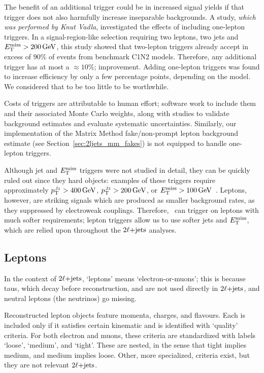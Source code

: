 The benefit of an additional trigger could be in increased signal yields if
that trigger does not also harmfully increase inseparable backgrounds.
A study, \emph{which was performed by Knut Vadla}, investigated the effects
of including one-lepton triggers.
In a signal-region-like selection requiring two leptons, two jets and
$\met > 200\,\eV[G]$, this study showed that two-lepton triggers already accept
in excess of $90\%$ of events from benchmark C1N2 models.
Therefore, any additional trigger has at most a $\approx10\%$;
improvement. Adding one-lepton triggers was found to increase efficiency by
only a few percentage points, depending on the model.
We considered that to be too little to be worthwhile.

Costs of triggers are attributable to human effort;
software work to include them and their associated Monte Carlo weights, along
with studies to validate background estimates and evaluate systematic
uncertainties.
Similarly, our implementation of the Matrix Method fake/non-prompt lepton
background estimate (see Section~\ref{sec:2ljets_mm_fakes}) is not equipped to
handle one-lepton triggers.

Although jet and $\met$ triggers were not studied in detail, they can be
quickly ruled out since they hard objects: examples of these triggers require
approximately $\ptjone > 400\,\eV[G]$, $p_\mathrm{T}^{\,j_3} > 200\,\eV[G]$, or
$\met > 100\,\eV[G]$~\cite{atlas_twiki_lowest_unprescaled}.
Leptons, however, are striking signals which are produced as smaller background
rates, as they suppressed by electroweak couplings.
Therefore, \atlas\ can trigger on leptons with much softer requirements;
lepton triggers allow us to use softer jets and $\met$, which are relied upon
throughout the $\twoljets$ analyses.


\subsection{Leptons}
In the context of $\twoljets$, `leptons' means `electron-or-muons';
this is because taus, which decay before reconstruction, and are not used
directly in $\twoljets$, and neutral leptons (the neutrinos) go missing.

Reconstructed lepton objects feature momenta, charges, and flavours.
Each is included only if it satisfies certain kinematic and
is identified with `quality' criteria.
For both electron and muons, these criteria are standardized with labels
`loose', `medium', and `tight'.
These are nested, in the sense that tight implies medium,
and medium implies loose.
Other, more specialized, criteria exist, but they are not relevant $\twoljets$.

